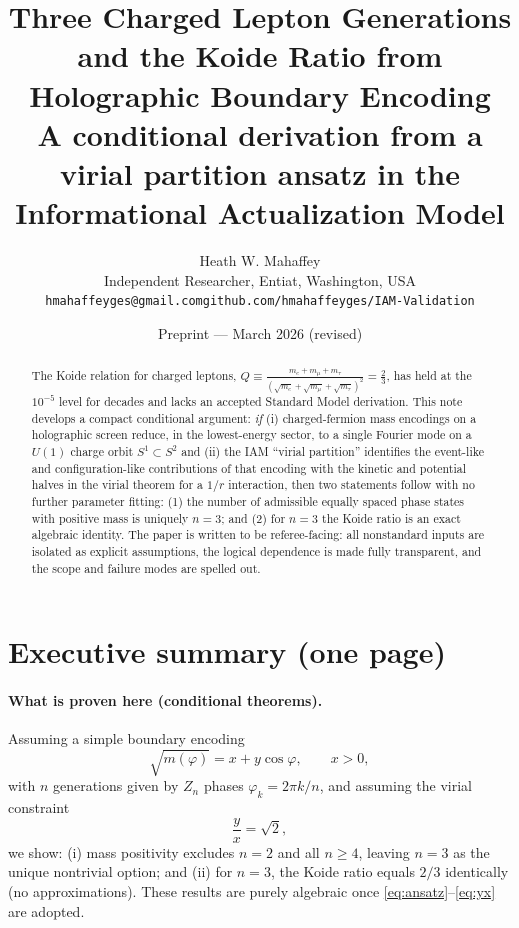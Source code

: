 \documentclass[12pt,a4paper]{article}
\title{\textbf{Three Charged Lepton Generations and the Koide Ratio from Holographic Boundary Encoding}\\[0.4em]
\large A conditional derivation from a virial partition ansatz in the Informational Actualization Model}
\author{Heath W. Mahaffey\\
\small Independent Researcher, Entiat, Washington, USA\\
\small \texttt{hmahaffeyges@gmail.com}\quad \texttt{github.com/hmahaffeyges/IAM-Validation}}
\date{Preprint --- March 2026 (revised)}
\begin{document}
\maketitle

\begin{abstract}
The Koide relation for charged leptons,
$Q \equiv \frac{m_e+m_\mu+m_\tau}{\left(\sqrt{m_e}+\sqrt{m_\mu}+\sqrt{m_\tau}\right)^2}=\frac{2}{3}$,
has held at the $10^{-5}$ level for decades and lacks an accepted Standard Model derivation.
This note develops a compact conditional argument: \emph{if} (i) charged-fermion mass encodings on a holographic screen reduce, in the lowest-energy sector, to a single Fourier mode on a $U(1)$ charge orbit $S^1\subset S^2$ and (ii) the IAM ``virial partition'' identifies the event-like and configuration-like contributions of that encoding with the kinetic and potential halves in the virial theorem for a $1/r$ interaction, then two statements follow with no further parameter fitting:
(1) the number of admissible equally spaced phase states with positive mass is uniquely $n=3$; and
(2) for $n=3$ the Koide ratio is an exact algebraic identity.
The paper is written to be referee-facing: all nonstandard inputs are isolated as explicit assumptions, the logical dependence is made fully transparent, and the scope and failure modes are spelled out.
\end{abstract}

\section{Executive summary (one page)}
\label{sec:exec}

\paragraph{What is proven here (conditional theorems).}
Assuming a simple boundary encoding
\begin{equation}
\sqrt{m(\varphi)} = x + y\cos\varphi,\qquad x>0,
\label{eq:ansatz}
\end{equation}
with $n$ generations given by $Z_n$ phases $\varphi_k=2\pi k/n$,
and assuming the virial constraint
\begin{equation}
\frac{y}{x}=\sqrt{2},
\label{eq:yx}
\end{equation}
we show:
(i) mass positivity excludes $n=2$ and all $n\ge 4$, leaving $n=3$ as the unique nontrivial option; and
(ii) for $n=3$, the Koide ratio equals $2/3$ identically (no approximations).
These results are purely algebraic once \eqref{eq:ansatz}--\eqref{eq:yx} are adopted.
\end{document}
